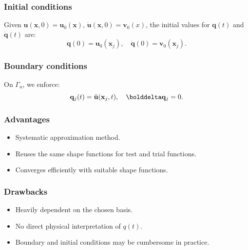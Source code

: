 \documentclass[12pt]{article}
\begin{document}
\subsubsection*{Initial conditions}
Given \( \mathbf u(\mathbf x,0) = \mathbf u_0(\mathbf x) \), \( \dot{\mathbf u}(\mathbf x,0) = \mathbf v_0(x) \), the initial values for \( \mathbf q(t) \) and \( \dot{\mathbf q}(t) \) are:
\[
    \mathbf q(0) =\mathbf u_0(\mathbf x_j), \quad \dot{\mathbf q}(0) = \mathbf v_0(\mathbf x_j).
\]

\subsubsection*{Boundary conditions}
On \( \Gamma_u \), we enforce:
\[
    \mathbf q_j(t) = \hat{\mathbf u}(\mathbf x_j,t), \quad \bolddelta\mathbf  q_j = 0.
\]

\subsubsection*{Advantages}
\begin{itemize}
    \item Systematic approximation method.
    \item Reuses the same shape functions for test and trial functions.
    \item Converges efficiently with suitable shape functions.
\end{itemize}

\subsubsection*{Drawbacks}
\begin{itemize}
    \item Heavily dependent on the chosen basis.
    \item No direct physical interpretation of \( q(t) \).
    \item Boundary and initial conditions may be cumbersome in practice.
\end{itemize}
\end{document}
